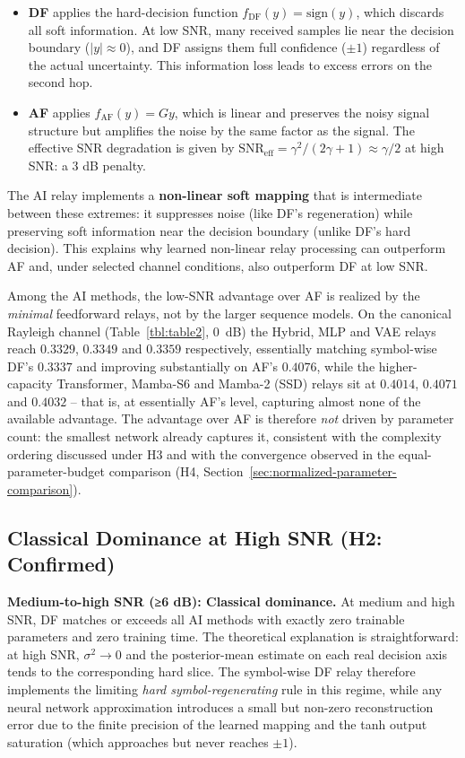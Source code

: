 \begin{itemize}
\item
  \textbf{DF} applies the hard-decision function \(f_{\text{DF}}(y) = \text{sign}(y)\), which discards all soft information. At low SNR, many received samples lie near the decision boundary (\(|y| \approx 0\)), and DF assigns them full confidence (\(\pm 1\)) regardless of the actual uncertainty. This information loss leads to excess errors on the second hop.
\item
  \textbf{AF} applies \(f_{\text{AF}}(y) = Gy\), which is linear and preserves the noisy signal structure but amplifies the noise by the same factor as the signal. The effective SNR degradation is given by \(\text{SNR}_{\text{eff}} = \gamma^2 / (2\gamma + 1) \approx \gamma/2\) at high SNR: a 3 dB penalty.
\end{itemize}

The AI relay implements a \textbf{non-linear soft mapping} that is intermediate between these extremes: it suppresses noise (like DF's regeneration) while preserving soft information near the decision boundary (unlike DF's hard decision). This explains why learned non-linear relay processing can outperform AF and, under selected channel conditions, also outperform DF at low SNR.

Among the AI methods, the low-SNR advantage over AF is realized by the \emph{minimal} feedforward relays, not by the larger sequence models. On the canonical Rayleigh channel (Table~\ref{tbl:table2}, 0~dB) the Hybrid, MLP and VAE relays reach $0.3329$, $0.3349$ and $0.3359$ respectively, essentially matching symbol-wise DF's $0.3337$ and improving substantially on AF's $0.4076$, while the higher-capacity Transformer, Mamba-S6 and Mamba-2 (SSD) relays sit at $0.4014$, $0.4071$ and $0.4032$ -- that is, at essentially AF's level, capturing almost none of the available advantage. The advantage over AF is therefore \emph{not} driven by parameter count: the smallest network already captures it, consistent with the complexity ordering discussed under H3 and with the convergence observed in the equal-parameter-budget comparison (H4, Section~\ref{sec:normalized-parameter-comparison}).

\subsection{Classical Dominance at High SNR (H2: Confirmed)}\label{sec:classical-dominance-at-high-snr-h2-confirmed}

\textbf{Medium-to-high SNR (≥6 dB): Classical dominance.} At medium and high SNR, DF matches or exceeds all AI methods with exactly zero trainable parameters and zero training time. The theoretical explanation is straightforward: at high SNR, \(\sigma^2 \to 0\) and the posterior-mean estimate on each real decision axis tends to the corresponding hard slice. The symbol-wise DF relay therefore implements the limiting \emph{hard symbol-regenerating} rule in this regime, while any neural network approximation introduces a small but non-zero reconstruction error due to the finite precision of the learned mapping and the tanh output saturation (which approaches but never reaches \(\pm 1\)).

